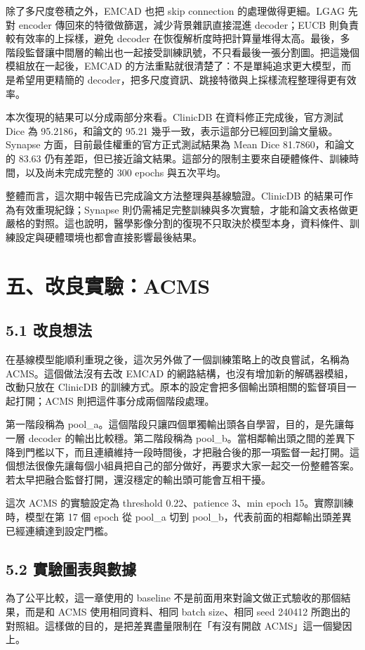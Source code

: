 \documentclass[a4paper,12pt,twocolumn]{article}
\begin{document}
除了多尺度卷積之外，EMCAD 也把 skip connection 的處理做得更細。LGAG 先對 encoder 傳回來的特徵做篩選，減少背景雜訊直接混進 decoder；EUCB 則負責較有效率的上採樣，避免 decoder 在恢復解析度時把計算量堆得太高。最後，多階段監督讓中間層的輸出也一起接受訓練訊號，不只看最後一張分割圖。把這幾個模組放在一起後，EMCAD 的方法重點就很清楚了：不是單純追求更大模型，而是希望用更精簡的 decoder，把多尺度資訊、跳接特徵與上採樣流程整理得更有效率。

本次復現的結果可以分成兩部分來看。ClinicDB 在資料修正完成後，官方測試 Dice 為 95.2186，和論文的 95.21 幾乎一致，表示這部分已經回到論文量級。Synapse 方面，目前最佳權重的官方正式測試結果為 Mean Dice 81.7860，和論文的 83.63 仍有差距，但已接近論文結果。這部分的限制主要來自硬體條件、訓練時間，以及尚未完成完整的 300 epochs 與五次平均。

整體而言，這次期中報告已完成論文方法整理與基線驗證。ClinicDB 的結果可作為有效重現紀錄；Synapse 則仍需補足完整訓練與多次實驗，才能和論文表格做更嚴格的對照。這也說明，醫學影像分割的復現不只取決於模型本身，資料條件、訓練設定與硬體環境也都會直接影響最後結果。

\section*{五、改良實驗：ACMS}
\subsection*{5.1 改良想法}
在基線模型能順利重現之後，這次另外做了一個訓練策略上的改良嘗試，名稱為 ACMS。這個做法沒有去改 EMCAD 的網路結構，也沒有增加新的解碼器模組，改動只放在 ClinicDB 的訓練方式。原本的設定會把多個輸出頭相關的監督項目一起打開；ACMS 則把這件事分成兩個階段處理。

第一階段稱為 pool\_a。這個階段只讓四個單獨輸出頭各自學習，目的，是先讓每一層 decoder 的輸出比較穩。第二階段稱為 pool\_b。當相鄰輸出頭之間的差異下降到門檻以下，而且連續維持一段時間後，才把融合後的那一項監督一起打開。這個想法很像先讓每個小組員把自己的部分做好，再要求大家一起交一份整體答案。若太早把融合監督打開，還沒穩定的輸出頭可能會互相干擾。

這次 ACMS 的實驗設定為 threshold 0.22、patience 3、min epoch 15。實際訓練時，模型在第 17 個 epoch 從 pool\_a 切到 pool\_b，代表前面的相鄰輸出頭差異已經連續達到設定門檻。

\subsection*{5.2 實驗圖表與數據}
為了公平比較，這一章使用的 baseline 不是前面用來對論文做正式驗收的那個結果，而是和 ACMS 使用相同資料、相同 batch size、相同 seed 240412 所跑出的對照組。這樣做的目的，是把差異盡量限制在「有沒有開啟 ACMS」這一個變因上。
\end{document}

